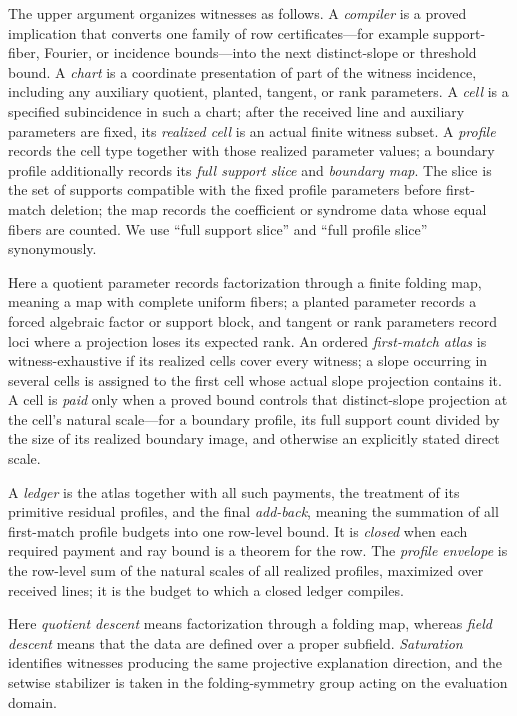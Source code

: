 \documentclass[12pt,a4paper]{amsart}
\numberwithin{equation}{section}
\theoremstyle{remark}
\begin{document}
The upper argument organizes witnesses as follows.  A \emph{compiler} is
a proved implication that converts one family of row certificates---for
example support-fiber, Fourier, or incidence bounds---into the next
distinct-slope or threshold bound.  A \emph{chart} is a
coordinate presentation of part of the witness incidence, including any
auxiliary quotient, planted, tangent, or rank parameters.  A \emph{cell}
is a specified subincidence in such a chart; after the received line and
auxiliary parameters are fixed, its \emph{realized cell} is an actual
finite witness subset.  A \emph{profile} records the cell type together
with those realized parameter values; a boundary profile additionally
records its \emph{full support slice} and \emph{boundary map}.  The slice
is the set of supports compatible with the fixed profile parameters before
first-match deletion; the map records the coefficient or syndrome data
whose equal fibers are counted.  We use ``full support slice'' and ``full
profile slice'' synonymously.

Here a quotient parameter records factorization through a finite folding
map, meaning a map with complete uniform fibers; a
planted parameter records a forced algebraic factor or support block, and
tangent or rank parameters record loci where a projection loses its
expected rank.  An ordered
\emph{first-match atlas} is witness-exhaustive if its realized cells cover
every witness; a slope occurring in several cells is assigned to the first
cell whose actual slope projection contains it.  A cell is \emph{paid}
only when a proved bound controls that distinct-slope projection at the
cell's natural scale---for a boundary profile, its full support count
divided by the size of its realized boundary image, and otherwise an
explicitly stated direct scale.

A \emph{ledger} is the atlas together with all such
payments, the treatment of its primitive residual profiles, and the final
\emph{add-back}, meaning the summation of all first-match profile budgets
into one row-level bound.  It is \emph{closed} when each required payment and ray bound is
a theorem for the row.  The \emph{profile envelope} is the row-level sum
of the natural scales of all realized profiles, maximized over received
lines; it is the budget to which a closed ledger compiles.

Here \emph{quotient descent} means factorization through a folding map,
whereas \emph{field descent} means that the data are defined over a proper
subfield.  \emph{Saturation} identifies witnesses producing the same
projective explanation direction, and the setwise stabilizer is taken in
the folding-symmetry group acting on the evaluation domain.
\end{document}
